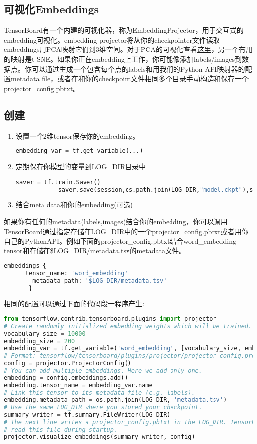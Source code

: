\subsection{可视化Embeddings}
TensorBoard有一个内建的可视化器，称为EmbeddingProjector，用于交互式的embedding可视化。embedding projector将从你的checkpointer文件读取embeddings用PCA映射它们到3维空间。对于PCA的可视化查看\href{http://setosa.io/ev/principal-component-analysis/}{这里}，另一个有用的映射是t-SNE。如果你正在embedding上工作，你可能像添加labels/images到数据点。你可以通过生成一个包含每个点的labels和用我们的Python API映射器的配置\href{https://www.tensorflow.org/programmers_guide/embedding#metadata}{metadata file}，或者在和你的checkpoint文件相同多个目录手动构造和保存一个projector\_config.pbtxt。
\subsection{创建}
\begin{enumerate}
	\item 设置一个2维tensor保存你的embedding。
		\begin{lstlisting}[language=Python]
			embedding_var = tf.get_variable(...)
		\end{lstlisting}
	\item 定期保存你模型的变量到LOG\_DIR目录中
		\begin{lstlisting}[language=Python]
			saver = tf.train.Saver()
			saver.save(session,os.path.join(LOG_DIR,"model.ckpt"),step)
		\end{lstlisting}
	\item 结合meta data和你的embedding(可选)
\end{enumerate}
如果你有任何的metadata(labels,images)结合你的embedding，你可以调用TensorBoard通过指定存储在LOG\_DIR中的一个projector\_config.pbtxt或者用你自己的PythonAPI。例如下面的projector\_config.pbtxt结合word\_embedding tensor和存储在\$LOG\_DIR/metadata.tsv的metadata文件。
\begin{lstlisting}[language=Python]
embeddings {
	  tensor_name: 'word_embedding'
	    metadata_path: '$LOG_DIR/metadata.tsv'
	   }
\end{lstlisting}
相同的配置可以通过下面的代码段一程序产生:
\begin{lstlisting}[language=Python]
from tensorflow.contrib.tensorboard.plugins import projector
# Create randomly initialized embedding weights which will be trained.
vocabulary_size = 10000
embedding_size = 200
embedding_var = tf.get_variable('word_embedding', [vocabulary_size, embedding_size])
# Format: tensorflow/tensorboard/plugins/projector/projector_config.proto
config = projector.ProjectorConfig()
# You can add multiple embeddings. Here we add only one.
embedding = config.embeddings.add()
embedding.tensor_name = embedding_var.name
# Link this tensor to its metadata file (e.g. labels).
embedding.metadata_path = os.path.join(LOG_DIR, 'metadata.tsv')
# Use the same LOG_DIR where you stored your checkpoint.
summary_writer = tf.summary.FileWriter(LOG_DIR)
# The next line writes a projector_config.pbtxt in the LOG_DIR. TensorBoard will
# read this file during startup.
projector.visualize_embeddings(summary_writer, config)
\end{lstlisting}
